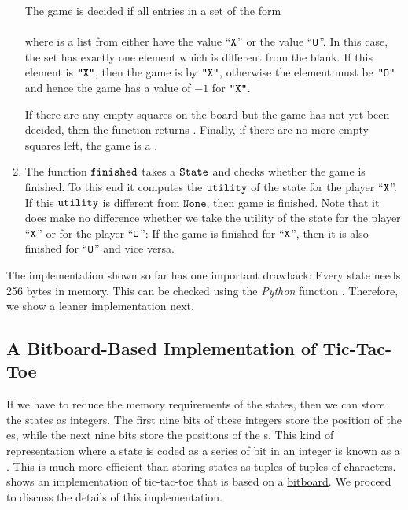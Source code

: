 \begin{enumerate}
      The game is decided if all entries in a set of the form 
      \\[0.2cm]
      \hspace*{1.3cm}
      \\[0.2cm]
      where  is a list from  either have the value
      ``$\texttt{X}$'' or the value ``$\texttt{O}$''.  In this case, the set  has exactly one
      element which is different from the blank.  If this element is $\texttt{"X"}$, then the
      game is  by $\texttt{"X"}$, otherwise the element must be $\texttt{"O"}$ and hence
      the game has a value of $-1$ for $\texttt{"X"}$.

      If there are any empty squares on the board but the game has not yet been decided,
      then the function returns .  Finally, if there are no more empty squares left, the game is a
      . 
\item The function $\texttt{finished}$ takes a $\texttt{State}$ and checks whether the game is finished.
      To this end it computes the $\texttt{utility}$ of the state for the player ``$\texttt{X}$''.  
      If this $\texttt{utility}$ is different from $\mathtt{None}$, then game is finished.  Note that it does make no
      difference whether we take the utility of the state for the player ``$\texttt{X}$'' or for the player
      ``$\texttt{O}$'': If the game is finished for  ``$\texttt{X}$'', then it is also finished for ``$\texttt{O}$'' and vice versa.
\end{enumerate}
The implementation shown so far has one important drawback: Every state needs 256 bytes in memory.
This can be checked using the \textsl{Python} function .
Therefore, we show a leaner implementation next.

\subsection{A Bitboard-Based Implementation of Tic-Tac-Toe}
If we have to reduce the memory requirements of the states, then we can store the states as integers.  The
first nine bits of these integers store the position of the es, while the next nine bits store the
positions of the s.  This kind of representation where a state is coded as a series of bit in an
integer is known as a  .  This is much more efficient than storing states as
tuples of tuples of characters.   shows an implementation of tic-tac-toe that
is based on a \href{https://en.wikipedia.org/wiki/Bitboard}{bitboard}.  We proceed to discuss the details of
this implementation.

